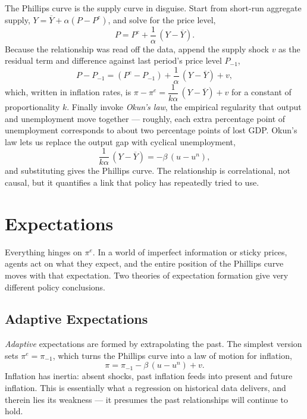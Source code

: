 The Phillips curve is the supply curve in disguise. Start from short-run aggregate supply, $Y=\overline{Y}+\alpha(P-P^{e})$, and solve for the price level,
\[
P = P^{e} + \frac{1}{\alpha}\,(Y-\overline{Y}).
\]
Because the relationship was read off the data, append the supply shock $v$ as the residual term and difference against last period's price level $P_{-1}$,
\[
P - P_{-1} = (P^{e}-P_{-1}) + \frac{1}{\alpha}\,(Y-\overline{Y}) + v,
\]
which, written in inflation rates, is $\pi - \pi^{e} = \dfrac{1}{k\alpha}\,(Y-\overline{Y}) + v$ for a constant of proportionality $k$. Finally invoke \emph{Okun's law}, the empirical regularity that output and unemployment move together --- roughly, each extra percentage point of unemployment corresponds to about two percentage points of lost GDP. Okun's law lets us replace the output gap with cyclical unemployment,
\[
\frac{1}{k\alpha}\,(Y-\overline{Y}) = -\beta\,(u-u^{n}),
\]
and substituting gives the Phillips curve. The relationship is correlational, not causal, but it quantifies a link that policy has repeatedly tried to use.

\section{Expectations}

Everything hinges on $\pi^{e}$. In a world of imperfect information or sticky prices, agents act on what they expect, and the entire position of the Phillips curve moves with that expectation. Two theories of expectation formation give very different policy conclusions.

\subsection{Adaptive Expectations}

\emph{Adaptive} expectations are formed by extrapolating the past. The simplest version sets $\pi^{e}=\pi_{-1}$, which turns the Phillips curve into a law of motion for inflation,
\[
\pi = \pi_{-1} - \beta\,(u-u^{n}) + v.
\]
Inflation has inertia: absent shocks, past inflation feeds into present and future inflation. This is essentially what a regression on historical data delivers, and therein lies its weakness --- it presumes the past relationships will continue to hold.


